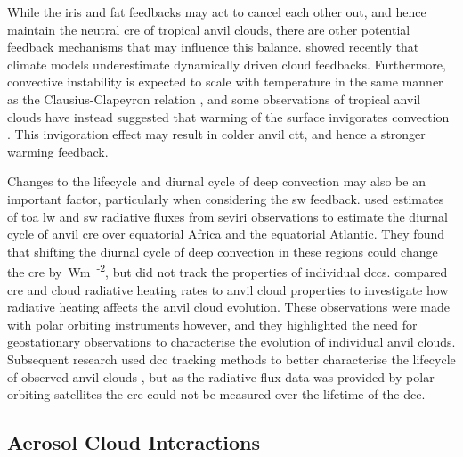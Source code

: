 While the iris and \acrshort{fat} feedbacks may act to cancel each other out, and hence maintain the neutral \acrshort{cre} of tropical anvil clouds, there are other potential feedback mechanisms that may influence this balance.
\citet{hill_climate_2023} showed recently that climate models underestimate dynamically driven cloud feedbacks.
Furthermore, convective instability is expected to scale with temperature in the same manner as the Clausius-Clapeyron relation \citep{seeley_why_2015, agard_clausius_2017}, and some observations of tropical anvil clouds have instead suggested that warming of the surface invigorates convection \citep{igel_cloudsat_2014}.
This invigoration effect may result in colder anvil \acrfull{ctt}, and hence a stronger warming feedback.

Changes to the lifecycle and diurnal cycle of deep convection may also be an important factor, particularly when considering the \acrshort{sw} feedback. 
\citet{nowicki_observations_2004} used estimates of \acrfull{toa} \acrshort{lw} and \acrshort{sw} radiative fluxes from \acrfull{seviri} observations to estimate the diurnal cycle of anvil \acrshort{cre} over equatorial Africa and the equatorial Atlantic. 
They found that shifting the diurnal cycle of deep convection in these regions could change the \acrshort{cre} by \,\unit{Wm\textsuperscript{-2}}, but did not track the properties of individual \acrshort{dcc}s.
\citet{bouniol_macrophysical_2016} compared \acrshort{cre} and cloud radiative heating rates to anvil cloud properties to investigate how radiative heating affects the anvil cloud evolution.
These observations were made with polar orbiting instruments however, and they highlighted the need for geostationary observations to characterise the evolution of individual anvil clouds.
Subsequent research used \acrshort{dcc} tracking methods to better characterise the lifecycle of observed anvil clouds \citep{bouniol_life_2021}, but as the radiative flux data was provided by polar-orbiting satellites the \acrshort{cre} could not be measured over the lifetime of the \acrshort{dcc}.


\subsection{Aerosol Cloud Interactions}

